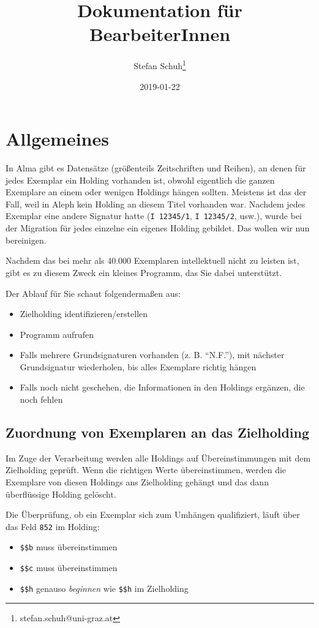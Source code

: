 \documentclass[10pt, a4paper]{scrartcl}
\author{Stefan Schuh\thanks{stefan.schuh@uni-graz.at}}
\date{2019-01-22}
\title{Dokumentation für BearbeiterInnen}
\begin{document}
\maketitle
\tableofcontents

\section{Allgemeines}
\label{sec:orgf3f4861}
In Alma gibt es Datensätze (größenteils Zeitschriften und Reihen), an denen
für jedes Exemplar ein Holding vorhanden ist, obwohl eigentlich die ganzen
Exemplare an einem oder wenigen Holdings hängen sollten. Meistens ist das
der Fall, weil in Aleph kein Holding an diesem Titel vorhanden war. Nachdem
jedes Exemplar eine andere Signatur hatte (\texttt{I 12345/1}, \texttt{I 12345/2}, usw.),
wurde bei der Migration für jedes einzelne ein eigenes Holding gebildet. Das
wollen wir nun bereinigen.

Nachdem das bei mehr als 40.000 Exemplaren intellektuell nicht zu leisten
ist, gibt es zu diesem Zweck ein kleines Programm, das Sie dabei
unterstützt.

Der Ablauf für Sie schaut folgendermaßen aus:

\begin{itemize}
\item Zielholding identifizieren/erstellen
\item Programm aufrufen
\item Falls mehrere Grundsignaturen vorhanden (z. B. "`N.F."'), mit nächster
Grundsignatur wiederholen, bis alles Exemplare richtig hängen
\item Falls noch nicht geschehen, die Informationen in den Holdings ergänzen,
die noch fehlen
\end{itemize}

\subsection{Zuordnung von Exemplaren an das Zielholding}
\label{sec:orgacf8deb}
Im Zuge der Verarbeitung werden alle Holdings auf Übereinstimmungen mit dem
Zielholding geprüft. Wenn die richtigen Werte übereinstimmen, werden die
Exemplare von diesen Holdings ans Zielholding gehängt und das dann
überflüssige Holding gelöscht.

Die Überprüfung, ob ein Exemplar sich zum Umhängen qualifiziert, läuft
über das Feld \texttt{852} im Holding:

\begin{itemize}
\item \texttt{\$\$b} muss übereinstimmen
\item \texttt{\$\$c} muss übereinstimmen
\item \texttt{\$\$h} genauso \emph{beginnen} wie \texttt{\$\$h} im Zielholding
\end{itemize}
\end{document}

